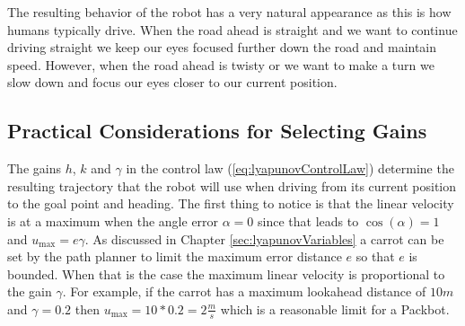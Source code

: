 The resulting behavior of the robot has a very natural appearance as this is how humans typically drive. When the road ahead is straight and we want to continue driving straight we keep our eyes focused further down the road and maintain speed. However, when the road ahead is twisty or we want to make a turn we slow down and focus our eyes closer to our current position.

\subsection{Practical Considerations for Selecting Gains}
\label{sec:lyapunovTrajectoryConvergence}
The gains $h$, $k$ and $\gamma$ in the control law (\ref{eq:lyapunovControlLaw}) determine the resulting trajectory that the robot will use when driving from its current position to the goal point and heading. The first thing to notice is that the linear velocity is at a maximum when the angle error $\alpha=0$ since that leads to $\cos(\alpha)=1$ and $u_{\text{max}}=e\gamma$. As discussed in Chapter \ref{sec:lyapunovVariables} a carrot can be set by the path planner to limit the maximum error distance $e$ so that $e$ is bounded. When that is the case the maximum linear velocity is proportional to the gain $\gamma$. For example, if the carrot has a maximum lookahead distance of $10m$ and $\gamma=0.2$ then $u_{\text{max}}=10*0.2=2\tfrac{m}{s}$ which is a reasonable limit for a Packbot.

